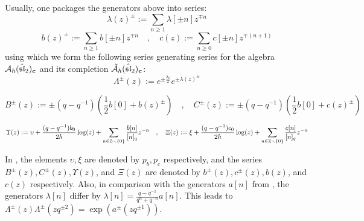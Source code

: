         Usually, one packages the generators above into series:
            $$\lambda(z)^{\pm} := \sum_{n \geq 1} \lambda[\pm n] z^{\mp n}$$
            $$
                b(z)^{\pm} := \sum_{n \geq 1} b[\pm n] z^{\mp n}
                \quad, \quad
                c(z) := \sum_{n \geq 0} c[\pm n] z^{\mp (n + 1)}
            $$
        using which we form the following series generating series for the algebra $\mathcal{A}_{\hbar}(\hat{\mathfrak{sl}}_2)_{\boldsymbol{c}}$ and its completion $\tilde{\mathcal{A}}_{\hbar}(\hat{\mathfrak{sl}}_2)_{\boldsymbol{c}}$:
            \begin{equation} \label{equation: q_deformed_affine_sl_2_heisenberg_weyl_Lambda_generating_series}
                \Lambda^{\pm}(z) := e^{ \pm \frac{\lambda_0}{2} } e^{ \pm \lambda(z)^{\pm} }
            \end{equation}
            
            \begin{equation} \label{equation: q_deformed_affine_sl_2_heisenberg_weyl_BC_generating_series}
                B^{\pm}(z) := \pm (q - q^{-1}) \left( \frac12 b[0] + b(z)^{\pm} \right)
                \quad, \quad
                C^{\pm}(z) := \pm (q - q^{-1}) \left( \frac12 b[0] + c(z)^{\pm} \right)
            \end{equation}
            
            \begin{equation} \label{equation: quatum_affine_sl_2_heisenberg_weyl_Theta_Xi_generating_series}
                \Upsilon(z) := \upsilon + \frac{(q - q^{-1}) b_0}{2\hbar} \log(z) + \sum_{n \in \mathbb{Z} \smallsetminus \{0\}} \frac{b[n]}{[n]_q} z^{-n}
                \quad, \quad
                \Xi(z) := \xi + \frac{(q - q^{-1}) c_0}{2\hbar} \log(z) + \sum_{n \in \mathbb{Z} \smallsetminus \{0\}} \frac{c[n]}{[n]_q} z^{-n}
            \end{equation}
        \begin{remark}
            In \cite{frenkel_reshetikhin_affine_QUEs_and_deformed_virasoro_and_finite_W_algebras}, the elements $\upsilon, \xi$ are denoted by $p_b, p_c$ respectively, and the series $B^{\pm}(z), C^{\pm}(z), \Upsilon(z)$, and $\Xi(z)$ are denoted by $b^{\pm}(z), c^{\pm}(z), b(z)$, and $c(z)$ respectively. Also, in comparison with the generators $a[n]$ from \cite{awata_odake_shiraishi_free_boson_realisation_of_quantum_affine_sl_N}, the generators $\lambda[n]$ differ by $\lambda[n] = \frac{q - q^{-1}}{q^n + q^{-n}} a[n]$. This leads to $\Lambda^{\pm}(z) \Lambda^{\pm}(z q^{\pm 2}) = \exp\left( a^{\pm}( z q^{\pm 1} ) \right)$. 
        \end{remark}

